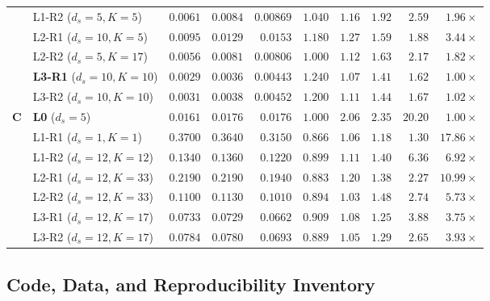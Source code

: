 \begin{table}[!htbp]
{\begin{tabular}{@{}llrrrrrrrr@{}}
 & L1-R2 ($d_s{=}5,K{=}5$)& $0.0061$ & $0.0084$ & $0.00869$& $1.040$ & $1.16$ & $1.92$ & $2.59$  & $1.96\times$ \\
 & L2-R1 ($d_s{=}10,K{=}5$)& $0.0095$& $0.0129$ & $0.0153$ & $1.180$ & $1.27$ & $1.59$ & $1.88$  & $3.44\times$ \\
 & L2-R2 ($d_s{=}5,K{=}17$)& $0.0056$& $0.0081$ & $0.00806$& $1.000$ & $1.12$ & $1.63$ & $2.17$  & $1.82\times$ \\
 & \textbf{L3-R1} ($d_s{=}10,K{=}10$)& $0.0029$& $0.0036$ & $\mathbf{0.00443}$& $1.240$ & $1.07$ & $1.41$ & $1.62$  & $\mathbf{1.00\times}$ \\
 & L3-R2 ($d_s{=}10,K{=}10$)& $0.0031$& $0.0038$ & $0.00452$& $1.200$ & $1.11$ & $1.44$ & $1.67$  & $1.02\times$ \\
\midrule
\textbf{C}
 & \textbf{L0} ($d_s{=}5$)& $0.0161$ & $0.0176$ & $\mathbf{0.0176}$ & $1.000$ & $2.06$ & $2.35$ & $20.20$ & $\mathbf{1.00\times}$ \\
 & L1-R1 ($d_s{=}1,K{=}1$)& $0.3700$ & $0.3640$ & $0.3150$ & $0.866$ & $1.06$ & $1.18$ & $1.30$  & $17.86\times$ \\
 & L1-R2 ($d_s{=}12,K{=}12$)& $0.1340$& $0.1360$& $0.1220$ & $0.899$ & $1.11$ & $1.40$ & $6.36$  & $6.92\times$ \\
 & L2-R1 ($d_s{=}12,K{=}33$)& $0.2190$& $0.2190$& $0.1940$ & $0.883$ & $1.20$ & $1.38$ & $2.27$  & $10.99\times$ \\
 & L2-R2 ($d_s{=}12,K{=}33$)& $0.1100$& $0.1130$& $0.1010$ & $0.894$ & $1.03$ & $1.48$ & $2.74$  & $5.73\times$ \\
 & L3-R1 ($d_s{=}12,K{=}17$)& $0.0733$& $0.0729$& $0.0662$ & $0.909$ & $1.08$ & $1.25$ & $3.88$  & $3.75\times$ \\
 & L3-R2 ($d_s{=}12,K{=}17$)& $0.0784$& $0.0780$& $0.0693$ & $0.889$ & $1.05$ & $1.29$ & $2.65$  & $3.93\times$ \\
\bottomrule
\end{tabular}
}
\end{table}

\subsection{Code, Data, and Reproducibility Inventory}

